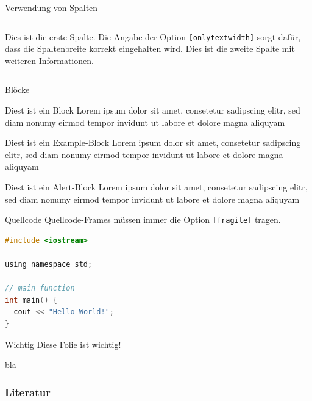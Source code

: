 \documentclass[fleqn,11pt,aspectratio=43]{beamer}
\begin{document}
\begin{frame}{Verwendung von Spalten}
  \begin{columns}[onlytextwidth]
      Dies ist die erste Spalte.
      Die Angabe der Option \texttt{[onlytextwidth]}
      sorgt dafür, dass die Spaltenbreite korrekt eingehalten wird.
      Dies ist die zweite Spalte mit weiteren Informationen.
  \end{columns}
\end{frame}


\begin{frame}{Blöcke}
  \begin{block}{Diest ist ein Block}
    Lorem ipsum dolor sit amet, consetetur sadipscing elitr, sed diam
    nonumy eirmod tempor invidunt ut labore et dolore magna aliquyam
  \end{block}
  \begin{exampleblock}{Diest ist ein Example-Block}
    Lorem ipsum dolor sit amet, consetetur sadipscing elitr, sed diam
    nonumy eirmod tempor invidunt ut labore et dolore magna aliquyam
  \end{exampleblock}
  \begin{alertblock}{Diest ist ein Alert-Block}
    Lorem ipsum dolor sit amet, consetetur sadipscing elitr, sed diam
    nonumy eirmod tempor invidunt ut labore et dolore magna aliquyam
  \end{alertblock}
\end{frame}


\begin{frame}[fragile]{Quellcode}
Quellcode-Frames müssen immer die Option \texttt{[fragile]} tragen.
\begin{lstlisting}[language=c]
#include <iostream>

using namespace std;

// main function
int main() {
  cout << "Hello World!";
}
\end{lstlisting}
\end{frame}


\begin{frame}[highlight]{Wichtig}
Diese Folie ist wichtig!
\end{frame}

\begin{frame}
bla\cite{wu2008top}
\frametitle{Literatur}


\end{frame}
\end{document}
